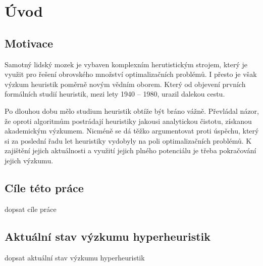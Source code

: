 \chapter{Úvod}
\setcounter{page}{1}

\section{Motivace}
Samotný lidský mozek je vybaven komplexním herutistickým strojem, který je využit pro řešení obrovského množství optimalizačních problémů. I přesto je však výzkum heuristik poměrně novým vědním oborem. Který od objevení prvních formálních studií heuristik, mezi lety 1940 -- 1980, urazil dalekou cestu.\cite{sorensen2017-1}

Po dlouhou dobu mělo studium heuristik obtíže být bráno vážně. Převládal názor, že oproti algoritmům postrádají heuristiky jakousi analytickou čistotu, získanou akademickým výzkumem. Nicméně se dá těžko argumentovat proti úspěchu, který si za poslední řadu let heuristiky vydobyly na poli optimalizačních problémů.\cite{sorensen2017-2} K zajištění jejich aktuálnosti a využití jejich plného potenciálu je třeba pokračování jejich výzkumu.





\section{Cíle této práce}

dopsat cíle práce


\section{Aktuální stav výzkumu hyperheuristik}

dopsat aktuální stav výzkumu hyperheuristik
\cite{DRAKE2020405}
